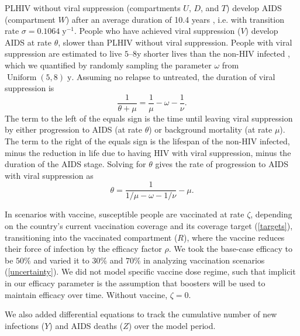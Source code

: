 \documentclass{article}
\DeclareMathOperator{\Uniform}{Uniform}
\begin{document}
PLHIV without viral suppression (compartments $U$, $D$, and $T$)
develop AIDS (compartment $W$) after an average duration of 10.4 years
\autocite{Morgan2002-cq}, i.e. with transition rate
$\sigma = 0.1064\;\text{y$^{-1}$}$.  People who have achieved viral
suppression ($V$) develop AIDS at rate $\theta$, slower than PLHIV
without viral suppression.  People with viral suppression are
estimated to live $5$--$8$\;y shorter lives than the non-HIV infected
\autocite{Samji2013-kf, Unaids2014-ue}, which we quantified by
randomly sampling the parameter $\omega$ from
$\Uniform(5, 8)\;\text{y}$.  Assuming no relapse to untreated, the
duration of viral suppression is
\begin{equation}
  \frac{1}{\theta + \mu} = \frac{1}{\mu} - \omega - \frac{1}{\nu}.
\end{equation}
The term to the left of the equals sign is the time until leaving
viral suppression by either progression to AIDS (at rate $\theta$) or
background mortality (at rate $\mu$).  The term to the right of the
equals sign is the lifespan of the non-HIV infected, minus the
reduction in life due to having HIV with viral suppression, minus the
duration of the AIDS stage.  Solving for $\theta$ gives the rate of
progression to AIDS with viral suppression as
\begin{equation}
  \label{theta}
  \theta = \frac{1}{1/\mu - \omega - 1/\nu} - \mu.
\end{equation}

In scenarios with vaccine, susceptible people are vaccinated at rate
$\zeta$, depending on the country's current vaccination coverage and
its coverage target (\autoref{targets}), transitioning into the
vaccinated compartment ($R$), where the vaccine reduces their force of
infection by the efficacy factor $\rho$.  We took the base-case
efficacy to be $50\%$ and varied it to $30\%$ and $70\%$ in analyzing
vaccination scenarios (\autoref{uncertainty}).  We did not model
specific vaccine dose regime, such that implicit in our efficacy
parameter is the assumption that boosters will be used to maintain
efficacy over time.  Without vaccine, $\zeta = 0$.

We also added differential equations to track the cumulative number of
new infections ($Y$) and AIDS deaths ($Z$) over the model period.
\end{document}
